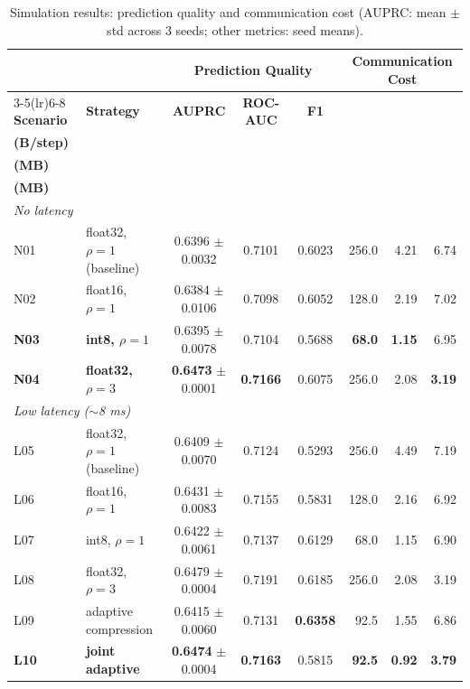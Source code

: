 \documentclass[conference]{IEEEtran}
\begin{document}
\begin{table}[ht]
\centering
\caption{Simulation results: prediction quality and communication cost (AUPRC: mean $\pm$ std across 3 seeds; other metrics: seed means).}
\label{tab:sim_results}
\small
\begin{tabularx}{\linewidth}{lXcccrrr}
\toprule
    & & \multicolumn{3}{c}{\textbf{Prediction Quality}} & \multicolumn{3}{c}{\textbf{Communication Cost}} \\
\cmidrule(lr){3-5}\cmidrule(lr){6-8}
\textbf{Scenario} & \textbf{Strategy} & \textbf{AUPRC} & \textbf{ROC-AUC} & \textbf{F1} & \makecell[r]{\textbf{Payload}\\\textbf{(B/step)}} & \makecell[r]{\textbf{Total}\\\textbf{(MB)}} & \makecell[r]{\textbf{Sync}\\\textbf{(MB)}} \\
\midrule
\multicolumn{8}{l}{\textit{No latency}} \\
N01 & float32, $\rho{=}1$ (baseline)   & 0.6396 $\pm$ 0.0032 & 0.7101 & 0.6023 & 256.0 & 4.21 & 6.74 \\
N02 & float16, $\rho{=}1$              & 0.6384 $\pm$ 0.0106 & 0.7098 & 0.6052 & 128.0 & 2.19 & 7.02 \\
\textbf{N03} & \textbf{int8, $\rho{=}1$} & 0.6395 $\pm$ 0.0078 & 0.7104 & 0.5688 & \textbf{68.0} & \textbf{1.15} & 6.95 \\
\textbf{N04} & \textbf{float32, $\rho{=}3$} & \textbf{0.6473} $\pm$ 0.0001 & \textbf{0.7166} & 0.6075 & 256.0 & 2.08 & \textbf{3.19} \\
\midrule
\multicolumn{8}{l}{\textit{Low latency ($\sim$8 ms)}} \\
L05 & float32, $\rho{=}1$ (baseline)   & 0.6409 $\pm$ 0.0070 & 0.7124 & 0.5293 & 256.0 & 4.49 & 7.19 \\
L06 & float16, $\rho{=}1$              & 0.6431 $\pm$ 0.0083 & 0.7155 & 0.5831 & 128.0 & 2.16 & 6.92 \\
L07 & int8, $\rho{=}1$                 & 0.6422 $\pm$ 0.0061 & 0.7137 & 0.6129 &  68.0 & 1.15 & 6.90 \\
L08 & float32, $\rho{=}3$              & 0.6479 $\pm$ 0.0004 & 0.7191 & 0.6185 & 256.0 & 2.08 & 3.19 \\
L09 & adaptive compression           & 0.6415 $\pm$ 0.0060 & 0.7131 & \textbf{0.6358} &  92.5 & 1.55 & 6.86 \\
\textbf{L10} & \textbf{joint adaptive} & \textbf{0.6474} $\pm$ 0.0004 & \textbf{0.7163} & 0.5815 & \textbf{92.5} & \textbf{0.92} & \textbf{3.79} \\

\end{tabularx}
\end{table}
\end{document}
